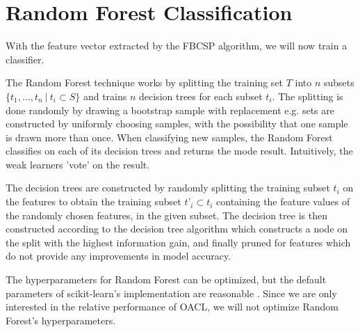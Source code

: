 \section{Random Forest Classification}\label{sec:randomforest}
With the feature vector extracted by the FBCSP algorithm, we will now train a classifier.

The Random Forest technique works by splitting the training set $T$ into $n$ subsets $\{t_1,…,t_n \ | \ t_i \subset S\}$ and trains $n$ decision trees for each subset $t_i$. The splitting is done randomly by drawing a bootstrap sample with replacement e.g. sets are constructed by uniformly choosing samples, with the possibility that one sample is drawn more than once. When classifying new samples, the Random Forest classifies on each of its decision trees and returns the mode result. Intuitively, the weak learners 'vote' on the result.

The decision trees are constructed by randomly splitting the training subset $t_i$ on the features to obtain the training subset $t’_i \subset t_i$ containing the feature values of the randomly chosen features, in the given subset. The decision tree is then constructed according to the decision tree algorithm which constructs a node on the split with the highest information gain, and finally pruned for features which do not provide any improvements in model accuracy.

The hyperparameters for Random Forest can be optimized, but the default parameters of scikit-learn's implementation are reasonable \citep{bernard2009influence}. Since we are only interested in the relative performance of OACL, we will not optimize Random Forest's hyperparameters.